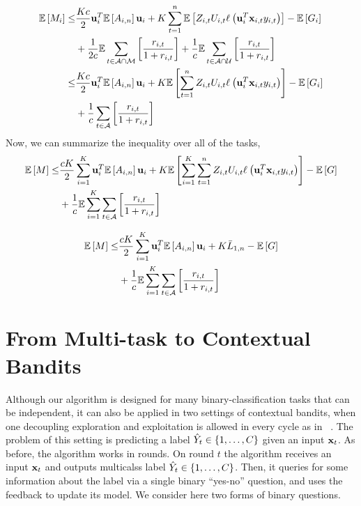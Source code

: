 \begin{equation*}
\begin{split}
\mathbb{E}\left[{M_{i}}\right]\le&\frac{Kc}{2} \mathbf{u}_i^T \mathbb{E}\left[{A_{i,n}}\right] \mathbf{u}_i+K\sum_{t=1}^{n}\mathbb{E}\left[{{Z_{i,t}U_{i,t}\ell_{}\left({\mathbf{u}_i^T\mathbf{x}_{i,t}y_{i,t}}\right)}}\right] -\mathbb{E}\left[{G_{i}}\right]\\
&+\frac{1}{2c}\mathbb{E}\sum_{t\in\mathcal{A\cap M}}\left[{\frac{r_{i,t}}{1+r_{i,t}}}\right]
+\frac{1}{c}\mathbb{E}\sum_{t\in\mathcal{A\cap U}}\left[{\frac{r_{i,t}}{1+r_{i,t}}}\right]\\
\le& \frac{Kc}{2} \mathbf{u}_i^T \mathbb{E}\left[{A_{i,n}}\right] \mathbf{u}_i+K\mathbb{E}\left[{\sum_{t=1}^{n}{Z_{i,t}U_{i,t}\ell_{}\left({\mathbf{u}_i^T\mathbf{x}_{i,t}y_{i,t}}\right)}}\right]-\mathbb{E}\left[{G_{i}}\right]\\
&+\frac{1}{c}\sum_{t\in\mathcal{A}}\left[{\frac{r_{i,t}}{1+r_{i,t}}}\right]
\end{split}
\end{equation*}
Now, we can summarize the inequality over all of the tasks,
\begin{equation*}
\begin{split}
\mathbb{E}\left[{M}\right]\le &\frac{cK}{2}\sum_{i=1}^{K}  \mathbf{u}_i^T \mathbb{E}\left[{A_{i,n}}\right] \mathbf{u}_i+K\mathbb{E}\left[{\sum_{i=1}^{K}\sum_{t=1}^{n}Z_{i,t}U_{i,t}{\ell_{}\left({\mathbf{u}_i^T\mathbf{x}_{i,t}y_{i,t}}\right)}}\right]-\mathbb{E}\left[{G}\right]\\
&+\frac{1}{c}\mathbb{E}\sum_{i=1}^{K}\sum_{t\in\mathcal{A}}\left[{\frac{r_{i,t}}{1+r_{i,t}}}\right]
\end{split}
\end{equation*}
 
\begin{equation*}
\begin{split}
\mathbb{E}\left[{M}\right]\le &\frac{cK}{2}\sum_{i=1}^{K}  \mathbf{u}_i^T \mathbb{E}\left[{A_{i,n}}\right] \mathbf{u}_i+K{\bar L}_{1,n}-\mathbb{E}\left[{G}\right]\\
&+\frac{1}{c}\mathbb{E}\sum_{i=1}^{K}\sum_{t\in\mathcal{A}}\left[{\frac{r_{i,t}}{1+r_{i,t}}}\right]
\end{split}
\end{equation*} 
 \section{From Multi-task to Contextual Bandits}
Although our algorithm is designed for many binary-classification tasks that can be independent, 
it can also be applied in two settings of contextual bandits, when one decoupling exploration and 
exploitation is allowed in every cycle as in ~\cite{DBLP:conf/icml/YuM09,DBLP:conf/icml/AvnerMS12}. 
The problem of this setting is predicting a label $\hat{Y}_t \in\{ 1 , \ldots , C\}$ given an input $\mathbf{x}_{t}$. 
As before, the algorithm works in rounds. On round $t$ the algorithm receives an input $\mathbf{x}_{t}$ and 
outputs  multicalss label $\hat{Y}_t\in\{1 , \ldots , C\}$. 
Then, it queries for some information about the label via a single binary ``yes-no'' question, and uses the 
feedback to update its model. We consider here two forms of binary questions.

